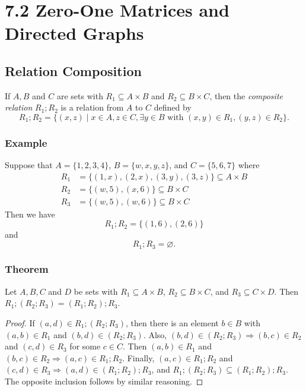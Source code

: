 \documentclass[11pt]{article}
\let\emptyset\varnothing
\begin{document}
    \section{7.2 Zero-One Matrices and Directed Graphs}
    
    \subsection{Relation Composition}

    If \(A,B\) and $C$ are sets with \(R_1 \subseteq A \times B\) and \(R_2 \subseteq B \times C\), then the \emph{composite relation} \(R_1 ; R_2\) is a relation from $A$ to $C$ defined by \[R_1 ; R_2 = \{(x,z) \mid x \in A, z \in C, \exists y \in B \text{ with } (x,y) \in R_1, (y,z) \in R_2\}.\]

    \subsubsection{Example}

    Suppose that \(A = \{1,2,3,4\}\), \(B = \{w,x,y,z\}\), and \(C = \{5,6,7\}\) where
    \begin{align*}
        R_1 &= \{(1,x),(2,x),(3,y),(3,z)\} \subseteq A \times B \\
        R_2 &= \{(w,5),(x,6)\} \subseteq B \times C \\
        R_3 &= \{(w,5), (w,6)\} \subseteq B \times C
    \end{align*}
    Then we have \[R_1;R_2 = \{(1,6),(2,6)\}\] and \[R_1;R_3 = \emptyset.\]

    \subsubsection{Theorem}

    Let \(A,B,C\) and $D$ be sets with \(R_1 \subseteq A \times B\), \(R_2 \subseteq B \times C\), and \(R_3 \subseteq C \times D.\) Then \(R_1;(R_2;R_3) = (R_1;R_2);R_3.\)

    \begin{proof}
        If \((a,d) \in R_1;(R_2;R_3)\), then there is an element \(b \in B\) with \((a,b) \in R_1\) and \((b,d) \in (R_2;R_3)\). Also, \((b,d) \in (R_2;R_3) \Rightarrow (b,c) \in R_2\) and \((c,d) \in R_3\) for some \(c \in C\). Then \((a,b) \in R_1\) and \((b,c) \in R_2 \Rightarrow (a,c) \in R_1;R_2\). Finally, \((a,c) \in R_1;R_2\) and \((c,d) \in R_3 \Rightarrow (a,d) \in (R_1;R_2);R_3\), and \(R_1;(R_2;R_3) \subseteq (R_1;R_2);R_3\). The opposite inclusion follows by similar reasoning.
    \end{proof}
\end{document}
